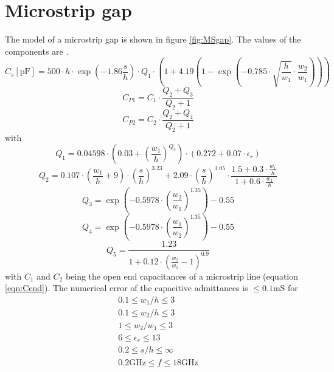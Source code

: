\documentclass[10pt]{report}
\begin{document}
\section{Microstrip gap}
The model of a microstrip gap is shown in figure \ref{fig:MSgap}. The
values of the components are \cite{Kirschning8}.
\begin{equation}
C_s[\text{pF}] = 500\cdot h\cdot\exp\left( -1.86\frac{s}{h} \right)\cdot Q_1\cdot
       \left( 1 + 4.19\left( 1 - \exp\left( -0.785\cdot\sqrt{\frac{h}{w_1}}\cdot
       \frac{w_2}{w_1} \right) \right) \right)
\end{equation}
\begin{equation}
C_{P1} = C_1\cdot \frac{Q_2+Q_3}{Q_2+1}
\end{equation}
\begin{equation}
C_{P2} = C_2\cdot \frac{Q_2+Q_4}{Q_2+1}
\end{equation}
with
\begin{equation}
Q_1 = 0.04598\cdot \left( 0.03 + \left(\frac{w_1}{h}\right)^{Q_5} \right)\cdot
      (0.272 + 0.07\cdot\epsilon_r)
\end{equation}
\begin{equation}
Q_2 = 0.107\cdot\left( \frac{w_1}{h}+9 \right) \cdot \left( \frac{s}{h} \right)^{3.23}
    + 2.09 \cdot \left( \frac{s}{h} \right)^{1.05}\cdot
    \frac{1.5+0.3\cdot\frac{w_1}{h}}{1+0.6\cdot\frac{w_1}{h}}
\end{equation}
\begin{equation}
Q_3 = \exp\left( -0.5978\cdot \left( \frac{w_2}{w_1} \right)^{1.35} \right) - 0.55
\end{equation}
\begin{equation}
Q_4 = \exp\left( -0.5978\cdot \left( \frac{w_1}{w_2} \right)^{1.35} \right) - 0.55
\end{equation}
\begin{equation}
Q_5 = \frac{1.23}{1 + 0.12\cdot \left( \frac{w_2}{w_1} - 1 \right)^{0.9}}
\end{equation}
with $C_1$ and $C_2$ being the open end capacitances of a microstrip line
(equation \ref{eqn:Cend}).
The numerical error of the capacitive admittances is $\le0.1$mS for
\begin{equation*}
\begin{split}
0.1\le w_1/h \le 3 \\
0.1\le w_2/h \le 3 \\
1\le w_2/w_1 \le 3 \\
6\le \epsilon_r \le 13 \\
0.2\le s/h \le \infty \\
0.2\text{GHz} \le f \le 18\text{GHz}
\end{split}
\end{equation*}
\end{document}
